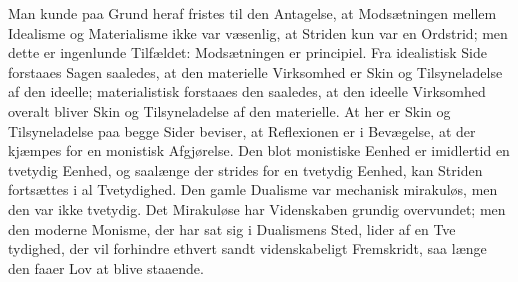 \documentclass[12pt]{article}
\newcommand{\opage}[1]{\marginnote{\footnotesize\textit{[#1]}}}
\begin{document}
Man kunde paa Grund heraf fristes til den Antagelse, at Modsætningen
mellem Idealisme og Materialisme ikke var væsenlig, at Striden kun
var en Ordstrid; men dette er ingenlunde Tilfældet: Modsætningen er
principiel. Fra idealistisk Side forstaaes Sagen saaledes, at den
materielle Virksomhed er Skin og Tilsyneladelse af den ideelle;
materialistisk forstaaes den saaledes, at den ideelle Virksomhed
overalt bliver Skin og Tilsyneladelse af den materielle. At her er
Skin og Tilsyneladelse paa begge Sider beviser, at Reflexionen er i
Bevægelse, at der kjæmpes for en monistisk Afgjørelse. Den blot
monistiske Eenhed er imidlertid en tvetydig Eenhed, og saalænge der
strides for en tvetydig Eenhed, kan Striden fortsættes i al
Tvetydighed. Den gamle Dualisme var mechanisk mirakuløs, men den var
ikke tvetydig. Det Mirakuløse har Videnskaben grundig overvundet;
men den moderne Monisme, der har sat sig i Dualismens Sted, lider af
en Tve%
\opage{53}tydighed, der vil forhindre ethvert sandt videnskabeligt Fremskridt,
saa længe den faaer Lov at blive staaende.
\end{document}
